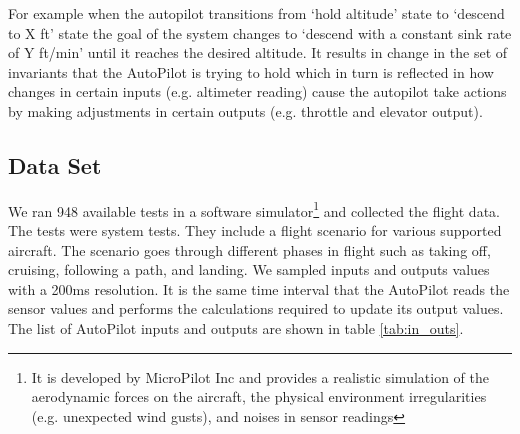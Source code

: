 For example when the autopilot transitions from `hold altitude' state to `descend to X ft' state the goal of the system changes to `descend with a constant sink rate of Y ft/min' until it reaches the desired altitude. It results in change in the set of invariants that the AutoPilot is trying to hold which in turn is reflected in how changes in certain inputs (e.g. altimeter reading) cause the autopilot take actions by making adjustments in certain outputs (e.g. throttle and elevator output). 


\subsection{Data Set} \label{mp_data_collection}
We ran 948 available tests in a software simulator\footnote{It is developed by MicroPilot Inc and provides a realistic simulation of the aerodynamic  forces on the aircraft, the physical environment irregularities (e.g. unexpected wind gusts), and noises in sensor readings} and collected the flight data. The tests were system tests. They include a flight scenario for various supported aircraft. The scenario goes through different phases in flight such as taking off, cruising, following a path, and landing.
We sampled inputs and outputs values with a 200ms resolution.
It is the same time interval that the AutoPilot reads the sensor values and performs the calculations required to update its output values.
The list of AutoPilot inputs and outputs are shown in table \ref{tab:in_outs}.


